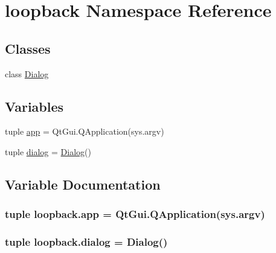\hypertarget{namespaceloopback}{}\section{loopback Namespace Reference}
\label{namespaceloopback}
\subsection*{Classes}
\begin{DoxyCompactItemize}
\item 
class \hyperlink{classloopback_1_1Dialog}{Dialog}
\end{DoxyCompactItemize}
\subsection*{Variables}
\begin{DoxyCompactItemize}
\item 
tuple \hyperlink{namespaceloopback_a253547949cbf4c567168e21e5e7d5ac9}{app} = Qt\+Gui.\+Q\+Application(sys.\+argv)
\item 
tuple \hyperlink{namespaceloopback_a94cdeddd36933c59a523e232da8a094d}{dialog} = \hyperlink{classloopback_1_1Dialog}{Dialog}()
\end{DoxyCompactItemize}


\subsection{Variable Documentation}
\hypertarget{namespaceloopback_a253547949cbf4c567168e21e5e7d5ac9}{}
\subsubsection[{app}]{\setlength{\rightskip}{0pt plus 5cm}tuple loopback.\+app = Qt\+Gui.\+Q\+Application(sys.\+argv)}\label{namespaceloopback_a253547949cbf4c567168e21e5e7d5ac9}
\hypertarget{namespaceloopback_a94cdeddd36933c59a523e232da8a094d}{}
\subsubsection[{dialog}]{\setlength{\rightskip}{0pt plus 5cm}tuple loopback.\+dialog = {\bf Dialog}()}\label{namespaceloopback_a94cdeddd36933c59a523e232da8a094d}
